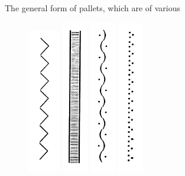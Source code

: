 \documentclass[twoside]{book}
\begin{document}
The general form of pallets, which are of various
	\begin{figure}[h]
		\centering
		\includegraphics[width=0.125\textwidth]{Figures/_079.png}
		\includegraphics[width=0.1\textwidth]{Figures/_080.png}
		\includegraphics[width=0.1\textwidth]{Figures/_081.png}
		\includegraphics[width=0.1\textwidth]{Figures/_082.png}

\end{figure}
\end{document}
